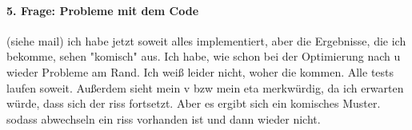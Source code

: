 \documentclass[10pt,a4paper]{article}
\begin{document}
\paragraph{5. Frage: Probleme mit dem Code}
(siehe mail)
ich habe jetzt soweit alles implementiert, aber die Ergebnisse, die ich bekomme, sehen "komisch" aus. Ich habe, wie schon bei der Optimierung nach u wieder Probleme am Rand. Ich weiß leider nicht, woher die kommen. Alle tests laufen soweit.
Außerdem sieht mein v bzw mein eta merkwürdig, da ich erwarten würde, dass sich der riss fortsetzt. Aber es ergibt sich ein komisches Muster. sodass abwechseln ein riss vorhanden ist und dann wieder nicht. 
\end{document}
